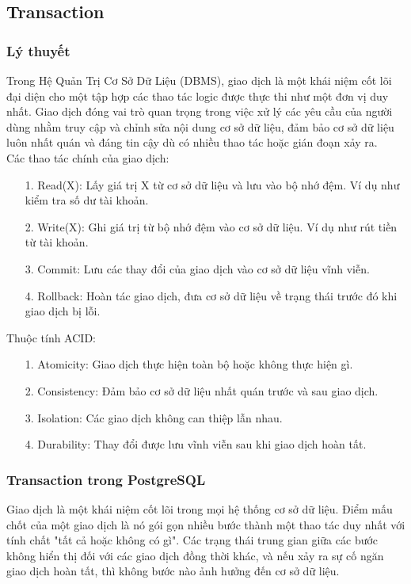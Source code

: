 \subsection{Transaction}
\subsubsection{Lý thuyết}
\indent Trong Hệ Quản Trị Cơ Sở Dữ Liệu (DBMS), giao dịch là một khái niệm cốt lõi đại diện cho một tập hợp các thao tác logic được thực thi như một đơn vị duy nhất. Giao dịch đóng vai trò quan trọng trong việc xử lý các yêu cầu của người dùng nhằm truy cập và chỉnh sửa nội dung cơ sở dữ liệu, đảm bảo cơ sở dữ liệu luôn nhất quán và đáng tin cậy dù có nhiều thao tác hoặc gián đoạn xảy ra.\\

\indent Các thao tác chính của giao dịch:
\begin{enumerate}
    \item[1.] Read(X): Lấy giá trị X từ cơ sở dữ liệu và lưu vào bộ nhớ đệm. Ví dụ như kiểm tra số dư tài khoản.
    \item[2.] Write(X): Ghi giá trị từ bộ nhớ đệm vào cơ sở dữ liệu. Ví dụ như rút tiền từ tài khoản.
    \item[3.] Commit: Lưu các thay đổi của giao dịch vào cơ sở dữ liệu vĩnh viễn.
    \item[4.] Rollback: Hoàn tác giao dịch, đưa cơ sở dữ liệu về trạng thái trước đó khi giao dịch bị lỗi. 
\end{enumerate}

\indent Thuộc tính ACID:
\begin{enumerate}
    \item[1.] Atomicity: Giao dịch thực hiện toàn bộ hoặc không thực hiện gì.
    \item[2.] Consistency: Đảm bảo cơ sở dữ liệu nhất quán trước và sau giao dịch.
    \item[3.] Isolation: Các giao dịch không can thiệp lẫn nhau.
    \item[4.] Durability: Thay đổi được lưu vĩnh viễn sau khi giao dịch hoàn tất. 
\end{enumerate}
\subsubsection{Transaction trong PostgreSQL}
\indent Giao dịch là một khái niệm cốt lõi trong mọi hệ thống cơ sở dữ liệu. Điểm mấu chốt của một giao dịch là nó gói gọn nhiều bước thành một thao tác duy nhất với tính chất "tất cả hoặc không có gì". Các trạng thái trung gian giữa các bước không hiển thị đối với các giao dịch đồng thời khác, và nếu xảy ra sự cố ngăn giao dịch hoàn tất, thì không bước nào ảnh hưởng đến cơ sở dữ liệu.\\

